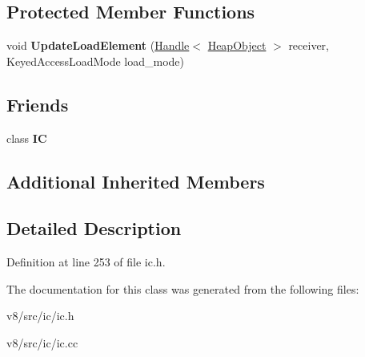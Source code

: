 \subsection*{Protected Member Functions}
\begin{DoxyCompactItemize}
\item 
\mbox{\label{classv8_1_1internal_1_1KeyedLoadIC_af15f53c2fd526c50072ea5d5e2cb9dbe}} 
void {\bfseries Update\+Load\+Element} (\mbox{\hyperlink{classv8_1_1internal_1_1Handle}{Handle}}$<$ \mbox{\hyperlink{classv8_1_1internal_1_1HeapObject}{Heap\+Object}} $>$ receiver, Keyed\+Access\+Load\+Mode load\+\_\+mode)
\end{DoxyCompactItemize}
\subsection*{Friends}
\begin{DoxyCompactItemize}
\item 
\mbox{\label{classv8_1_1internal_1_1KeyedLoadIC_ae59e849648858af1fd22081890d47b78}} 
class {\bfseries IC}
\end{DoxyCompactItemize}
\subsection*{Additional Inherited Members}


\subsection{Detailed Description}


Definition at line 253 of file ic.\+h.



The documentation for this class was generated from the following files\+:\begin{DoxyCompactItemize}
\item 
v8/src/ic/ic.\+h\item 
v8/src/ic/ic.\+cc\end{DoxyCompactItemize}
